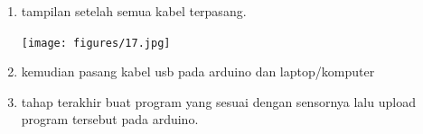 \begin{enumerate}
	\break
	\item tampilan setelah semua kabel terpasang.
	\break
	\centerline{\texttt{[image: figures/17.jpg]}}
	\break
	\item kemudian pasang kabel usb pada arduino dan laptop/komputer
	\break
	\item tahap terakhir buat program yang sesuai dengan sensornya lalu upload program tersebut pada arduino.


	
\end{enumerate}